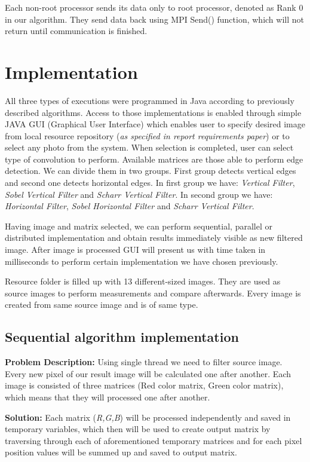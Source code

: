 \documentclass{article}
\begin{document}
Each non-root processor sends its data only to root processor, denoted as Rank 0 in our algorithm. They send data back using MPI Send() function, which will not return until communication is finished. 

\section{Implementation}

All three types of executions were programmed in Java according to previously described algorithms. Access to those implementations is enabled through simple JAVA GUI (Graphical User Interface) which enables user to specify desired image from local resource repository (\textit{as specified in report requirements paper}) or to select any photo from the system. When selection is completed, user can select type of convolution to perform. Available matrices are those able to perform edge detection. We can divide them in two groups. First group detects vertical edges and second one detects horizontal edges. In first group we have:\textit{ Vertical Filter}, \textit{Sobel Vertical Filter }and \textit{Scharr Vertical Filter}. In second group we have: \textit{Horizontal Filter}, \textit{Sobel Horizontal Filter }and \textit{Scharr Vertical Filter}.

 Having image and matrix selected, we can perform sequential, parallel or distributed implementation and obtain results immediately visible as  new filtered image. After image is processed GUI will present us with time taken in milliseconds to perform certain implementation we have chosen previously.  

Resource folder is filled up with 13 different-sized images. They are used as source images to perform measurements and compare afterwards. Every image is created from same source image and is of same type. 

\subsection{Sequential algorithm implementation}
\textbf{Problem Description:} Using single thread we need to filter source image. Every new pixel of our result image will be calculated one after another. Each image is consisted of three matrices (Red color matrix, Green color matrix), which means that they will processed one after another.

\textbf{Solution:} Each matrix (\textit{R,G,B}) will be processed independently and saved in temporary variables, which then will be used to create output matrix by traversing through each of aforementioned temporary matrices and for each pixel position values will  be summed up and saved to output matrix.
\end{document}
